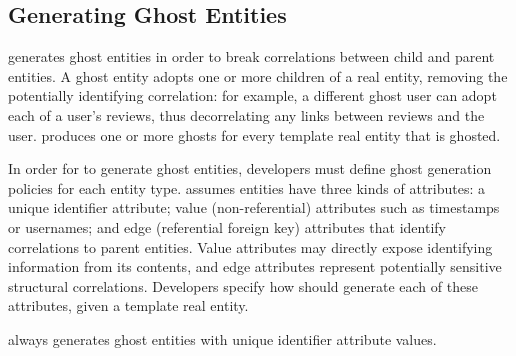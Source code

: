 \subsection{Generating Ghost Entities}
\label{sec:ghosting}

\sys generates ghost entities in order to break correlations between child and parent entities.  A
ghost entity adopts one or more children of a real entity, removing the potentially identifying
correlation: for example, a different ghost user can adopt each of a user's reviews, thus
decorrelating any links between reviews and the user. \sys produces one or more ghosts for every
template real entity that is ghosted. 

In order for \sys to generate ghost entities, developers must define ghost generation policies for
each entity type.  \sys assumes entities have three kinds of attributes: a unique identifier
attribute; value (non-referential) attributes such as timestamps or usernames; and edge (referential
foreign key) attributes that identify correlations to parent entities.  Value attributes may
directly expose identifying information from its contents, and edge attributes represent potentially
sensitive structural correlations.  Developers specify how \sys should generate each of these
attributes, given a template real entity.

\sys always generates ghost entities with unique identifier attribute values.

